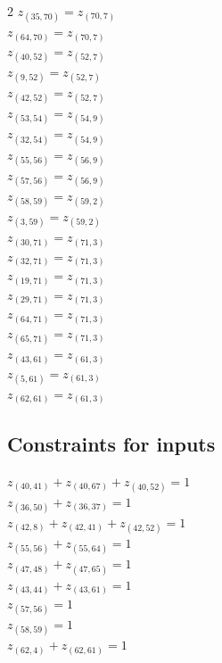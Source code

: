 \documentclass{article}
\begin{document}
\begin{multicols*}{2}
$z_{(35, 70)} = z_{(70, 7)}$\\ 
$z_{(64, 70)} = z_{(70, 7)}$\\ 
$z_{(40, 52)} = z_{(52, 7)}$\\ 
$z_{(9, 52)} = z_{(52, 7)}$\\ 
$z_{(42, 52)} = z_{(52, 7)}$\\ 
$z_{(53, 54)} = z_{(54, 9)}$\\ 
$z_{(32, 54)} = z_{(54, 9)}$\\ 
$z_{(55, 56)} = z_{(56, 9)}$\\ 
$z_{(57, 56)} = z_{(56, 9)}$\\ 
$z_{(58, 59)} = z_{(59, 2)}$\\ 
$z_{(3, 59)} = z_{(59, 2)}$\\ 
$z_{(30, 71)} = z_{(71, 3)}$\\ 
$z_{(32, 71)} = z_{(71, 3)}$\\ 
$z_{(19, 71)} = z_{(71, 3)}$\\ 
$z_{(29, 71)} = z_{(71, 3)}$\\ 
$z_{(64, 71)} = z_{(71, 3)}$\\ 
$z_{(65, 71)} = z_{(71, 3)}$\\ 
$z_{(43, 61)} = z_{(61, 3)}$\\ 
$z_{(5, 61)} = z_{(61, 3)}$\\ 
$z_{(62, 61)} = z_{(61, 3)}$
\subsection{Constraints for inputs}
$z_{(40, 41)}+z_{(40, 67)}+z_{(40, 52)} = 1$\\ 
$z_{(36, 50)}+z_{(36, 37)} = 1$\\ 
$z_{(42, 8)}+z_{(42, 41)}+z_{(42, 52)} = 1$\\ 
$z_{(55, 56)}+z_{(55, 64)} = 1$\\ 
$z_{(47, 48)}+z_{(47, 65)} = 1$\\ 
$z_{(43, 44)}+z_{(43, 61)} = 1$\\ 
$z_{(57, 56)} = 1$\\ 
$z_{(58, 59)} = 1$\\ 
$z_{(62, 4)}+z_{(62, 61)} = 1$
\end{multicols*}
     
\end{document}

